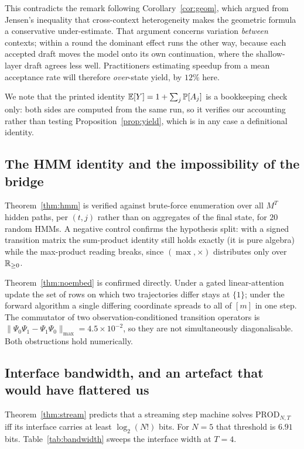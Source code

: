 This contradicts the remark following Corollary~\ref{cor:geom}, which argued from
Jensen's inequality that cross-context heterogeneity makes the geometric formula
a conservative under-estimate. That argument concerns variation \emph{between}
contexts; within a round the dominant effect runs the other way, because each
accepted draft moves the model onto its own continuation, where the shallow-layer
draft agrees less well. Practitioners estimating speedup from a mean acceptance
rate will therefore \emph{over}-state yield, by $12\%$ here.

We note that the printed identity $\mathbb{E}[Y] = 1 + \sum_j \mathbb{P}[A_j]$ is a
bookkeeping check only: both sides are computed from the same run, so it verifies
our accounting rather than testing Proposition~\ref{prop:yield}, which is in any
case a definitional identity.

\subsection{The HMM identity and the impossibility of the bridge}

Theorem~\ref{thm:hmm} is verified against brute-force enumeration over all $M^T$
hidden paths, per $(t,j)$ rather than on aggregates of the final state, for $20$
random HMMs. A negative control confirms the hypothesis split: with a signed
transition matrix the sum-product identity still holds exactly (it is pure
algebra) while the max-product reading breaks, since $(\max,\times)$ distributes
only over $\mathbb{R}_{\ge0}$.

Theorem~\ref{thm:noembed} is confirmed directly. Under a gated linear-attention
update the set of rows on which two trajectories differ stays at $\{1\}$; under
the forward algorithm a single differing coordinate spreads to all of $[m]$ in
one step. The commutator of two observation-conditioned transition operators is
$\|\Psi_0\Psi_1 - \Psi_1\Psi_0\|_{\max} = 4.5\times10^{-2}$, so they are not
simultaneously diagonalisable. Both obstructions hold numerically.

\subsection{Interface bandwidth, and an artefact that would have flattered us}
\label{sec:exp-bandwidth}

Theorem~\ref{thm:stream} predicts that a streaming step machine solves
$\mathrm{PROD}_{N,T}$ iff its interface carries at least $\log_2(N!)$ bits. For
$N=5$ that threshold is $6.91$ bits. Table~\ref{tab:bandwidth} sweeps the
interface width at $T=4$.

